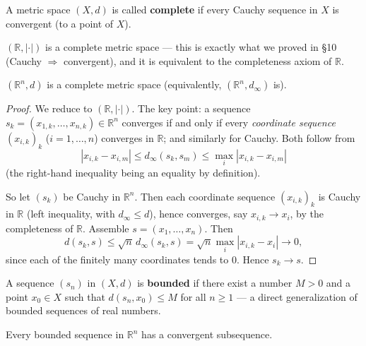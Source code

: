 \documentclass[11pt]{report}
\begin{document}
\begin{defbox}
A metric space $(X,d)$ is called \textbf{complete} if every Cauchy sequence in $X$ is convergent (to a point of $X$).
\end{defbox}

\begin{exbox}
$(\mathbb{R}, |\cdot|)$ is a complete metric space --- this is exactly what we proved in \S 10 (Cauchy $\Rightarrow$ convergent), and it is equivalent to the completeness axiom of $\mathbb{R}$.
\end{exbox}

\begin{thmbox}
$(\mathbb{R}^n, d)$ is a complete metric space (equivalently, $(\mathbb{R}^n, d_\infty)$ is).
\end{thmbox}

\begin{proof}
We reduce to $(\mathbb{R}, |\cdot|)$. The key point: a sequence $s_k = (x_{1,k}, \ldots, x_{n,k}) \in \mathbb{R}^n$ converges if and only if every \emph{coordinate sequence} $(x_{i,k})_{k}$ ($i = 1, \ldots, n$) converges in $\mathbb{R}$; and similarly for Cauchy. Both follow from
\[
|x_{i,k} - x_{i,m}| \leq d_\infty(s_k, s_m) \leq \max_i |x_{i,k} - x_{i,m}|
\]
(the right-hand inequality being an equality by definition).

So let $(s_k)$ be Cauchy in $\mathbb{R}^n$. Then each coordinate sequence $(x_{i,k})_k$ is Cauchy in $\mathbb{R}$ (left inequality, with $d_\infty \leq d$), hence converges, say $x_{i,k} \to x_i$, by the completeness of $\mathbb{R}$. Assemble $s = (x_1, \ldots, x_n)$. Then
\[
d(s_k, s) \leq \sqrt{n}\, d_\infty(s_k, s) = \sqrt{n} \max_i |x_{i,k} - x_i| \longrightarrow 0,
\]
since each of the finitely many coordinates tends to $0$. Hence $s_k \to s$.
\end{proof}

\begin{defbox}
A sequence $(s_n)$ in $(X,d)$ is \textbf{bounded} if there exist a number $M > 0$ and a point $x_0 \in X$ such that $d(s_n, x_0) \leq M$ for all $n \geq 1$ --- a direct generalization of bounded sequences of real numbers.
\end{defbox}

\begin{thmbox}
Every bounded sequence in $\mathbb{R}^n$ has a convergent subsequence.
\end{thmbox}
\end{document}
